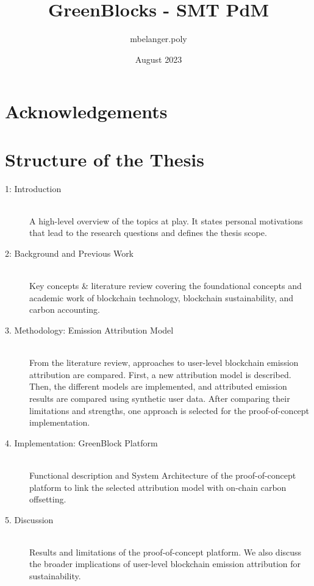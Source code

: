 \documentclass[11pt]{report}
\title{GreenBlocks - SMT PdM}
\author{mbelanger.poly}
\date{August 2023}
\begin{document}




\newpage
\section*{Acknowledgements}
\tableofcontents



\newpage

\section*{Structure of the Thesis}


\begin{description}
    \item [1: Introduction] \hfill \\
          A high-level overview of the topics at play. It states personal motivations that lead to the research questions and defines the thesis scope.
    \item [2: Background and Previous Work] \hfill \\
          Key concepts \& literature review covering the foundational concepts and academic work of blockchain technology, blockchain sustainability, and carbon accounting.
    \item [3. Methodology: Emission Attribution Model] \hfill \\
          From the literature review, approaches to user-level blockchain emission attribution are compared. First, a new attribution model is described. Then, the different models are implemented, and attributed emission results are compared using synthetic user data. After comparing their limitations and strengths, one approach is selected for the proof-of-concept implementation.
    \item [4. Implementation: GreenBlock Platform] \hfill \\
          Functional description and System Architecture of the proof-of-concept platform to link the selected attribution model with on-chain carbon offsetting.
    \item [5. Discussion] \hfill \\
          Results and limitations of the proof-of-concept platform. We also discuss the broader implications of user-level blockchain emission attribution for sustainability.

\end{description}
\end{document}
